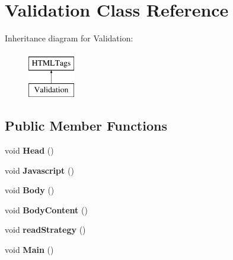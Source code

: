 \hypertarget{classValidation}{\section{Validation Class Reference}
\label{classValidation}
}
Inheritance diagram for Validation\-:\begin{figure}[H]
\begin{center}
\leavevmode
\includegraphics[height=2.000000cm]{classValidation}
\end{center}
\end{figure}
\subsection*{Public Member Functions}
\begin{DoxyCompactItemize}
\item 
\hypertarget{classValidation_a819164fd5c442a00234c711a52058183}{void {\bfseries Head} ()}\label{classValidation_a819164fd5c442a00234c711a52058183}

\item 
\hypertarget{classValidation_ab5ef950f034480d2d816f29931b9b1d6}{void {\bfseries Javascript} ()}\label{classValidation_ab5ef950f034480d2d816f29931b9b1d6}

\item 
\hypertarget{classValidation_a6be2c2abf5c3b046f0e66b6a59bd43b6}{void {\bfseries Body} ()}\label{classValidation_a6be2c2abf5c3b046f0e66b6a59bd43b6}

\item 
\hypertarget{classValidation_ace0de6d89e636387f1a3663df6850b2e}{void {\bfseries Body\-Content} ()}\label{classValidation_ace0de6d89e636387f1a3663df6850b2e}

\item 
\hypertarget{classValidation_a12a15d56dbb9ebce7f8675b5ae828524}{void {\bfseries read\-Strategy} ()}\label{classValidation_a12a15d56dbb9ebce7f8675b5ae828524}

\item 
\hypertarget{classValidation_a646be001379f091a4c9f38d9e784ab75}{void {\bfseries Main} ()}\label{classValidation_a646be001379f091a4c9f38d9e784ab75}

\end{DoxyCompactItemize}

